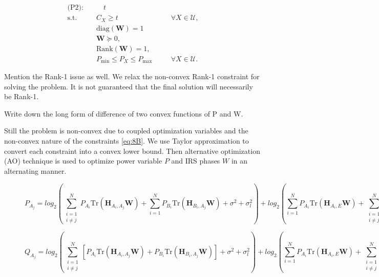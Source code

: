 \documentclass[lettersize,journal]{IEEEtran}
\begin{document}
\begin{subequations}\label{eq:8}
\begin{align}
\text{(P2):} \quad \mathop{\max_{\boldsymbol{W},\mathbf{P}}}  & \quad  t \label{eq:8A}\\
\textrm{s.t.} \quad & C_{X} \geq t & \quad & \forall X\in\mathcal{U},\label{eq:8B}\\
&\text{diag}(\boldsymbol{W}) = 1 \label{eq:8C}\\
  &\boldsymbol{W} \succeq 0 ,   \label{eq:8D}\\&\text{Rank}(\boldsymbol{W}) = 1 ,   \label{eq:8D}\\ & P_{\text{min}} \leq P_{X} \leq P_{\text{max}} & \quad & \forall X\in\mathcal{U}. \label{eq:8E}
\end{align}
\end{subequations}

Mention the Rank-1 issue as well. We relax the non-convex Rank-1 constraint for solving the problem. It is not guaranteed that the final solution will necessarily be Rank-1.

Write down the long form of difference of two convex functions of P and W.

Still the problem is non-convex due to coupled optimization variables and the non-convex nature of the constraints \eqref{eq:8B}. We use Taylor approximation to convert each constraint into a convex lower bound. Then alternative optimization (AO) technique is used to optimize power variable $P$ and IRS phases $W$ in an alternating manner.


\begin{figure}[!t]

\normalsize

\begin{equation}
\label{eqn_2_x}
P_{A_j} = log_2 \left(\sum_{\substack{i=1 \\ i\neq j}}^N  P_{A_i} \text{Tr}(\mathbf{H}_{A_i,A_j} \boldsymbol{W}) + \sum_{i=1}^N P_{B_i}\text{Tr}(\mathbf{H}_{B_i,A_j}\boldsymbol{W})  + \sigma^2 + \sigma_{l}^2\right) + log_2 \left(\sum_{i=1}^N  P_{A_i} \text{Tr}(\mathbf{H}_{A_i,E} \boldsymbol{W}) + \sum_{\substack{i=1 \\ i\neq j}}^N P_{B_i}\text{Tr}(\mathbf{H}_{B_i,E}\boldsymbol{W})  + \sigma^2\right)
\end{equation}

\begin{equation}
\label{eqn_2_y}
Q_{A_j} = log_2 \left(\sum_{\substack{i=1 \\ i\neq j}}^N  \left[P_{A_i} \text{Tr}(\mathbf{H}_{A_i,A_j} \boldsymbol{W}) +  P_{B_i}\text{Tr}(\mathbf{H}_{B_i,A_j}\boldsymbol{W})\right]  + \sigma^2 + \sigma_{l}^2\right) + log_2 \left(\sum_{i=1}^N  P_{A_i} \text{Tr}(\mathbf{H}_{A_i,E} \boldsymbol{W}) + \sum_{\substack{i=1 \\ i\neq j}}^N P_{B_i}\text{Tr}(\mathbf{H}_{B_i,E}\boldsymbol{W})  + \sigma^2\right)
\end{equation}

\hrulefill
\end{figure}
\end{document}
